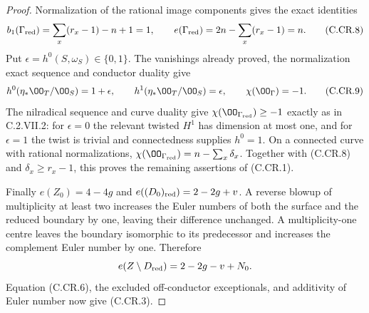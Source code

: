 \begin{proof}
Normalization of the rational image components gives the
exact identities
\[
 b_1(\Gamma_{\rm red})
   =\sum_x(r_x-1)-n+1=1,\qquad
 e(\Gamma_{\rm red})=2n-\sum_x(r_x-1)=n.
\tag{C.CR.8}
\]
Put $\epsilon=h^0(S,\omega_S)\in\{0,1\}$.
The vanishings already proved, the normalization exact
sequence and conductor duality give
\[
 h^0(\eta_*\OO_T/\OO_S)=1+\epsilon,\qquad
 h^1(\eta_*\OO_T/\OO_S)=\epsilon,
 \qquad\chi(\OO_\Gamma)=-1.
\tag{C.CR.9}
\]
The nilradical sequence and curve duality give
$\chi(\OO_{\Gamma_{\rm red}})\ge-1$ exactly as in
C.2.VII.2: for $\epsilon=0$ the relevant twisted $H^1$
has dimension at most one, and for $\epsilon=1$ the twist
is trivial and connectedness supplies $h^0=1$.
On a connected curve with rational normalizations,
$\chi(\OO_{\Gamma_{\rm red}})=n-\sum_x\delta_x$.
Together with (C.CR.8) and $\delta_x\ge r_x-1$, this
proves the remaining assertions of (C.CR.1).

Finally $e(Z_0)=4-4g$ and
$e((D_0)_{\rm red})=2-2g+v$. A reverse blowup of
multiplicity at least two increases the Euler numbers
of both the surface and the reduced boundary by one,
leaving their difference unchanged. A multiplicity-one
centre leaves the boundary isomorphic to its predecessor
and increases the complement Euler number by one.
Therefore
\[
 e(Z\setminus D_{\rm red})=2-2g-v+N_0.
\]
Equation (C.CR.6), the excluded off-conductor exceptionals,
and additivity of Euler number now give (C.CR.3).
\end{proof}


